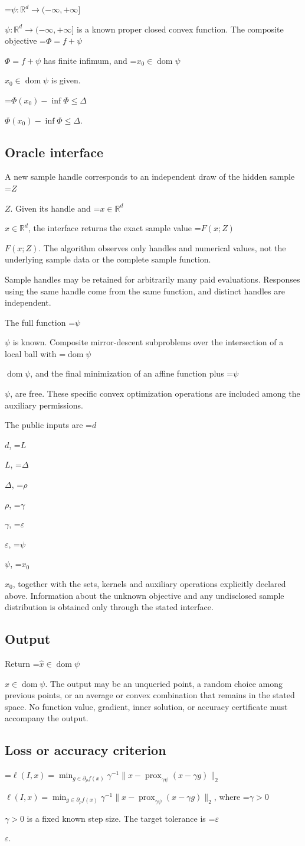 \documentclass[10pt,a4paper]{article}
\newcommand{\AtlasMath}[1]{\par\begingroup\centering\setbox0=\hbox{$\displaystyle #1$}\ifdim\wd0>1.4\linewidth\typeout{ATLAS WIDE FORMULA: \the\wd0}\fi\ifdim\wd0>\linewidth\resizebox{\linewidth}{!}{\box0}\else\box0\fi\par\endgroup}
\newcommand{\AtlasInlineMath}[1]{\begingroup\setbox0=\hbox{$#1$}\ifdim\wd0>.4\linewidth\endgroup\AtlasMath{#1}\else\endgroup$#1$\fi}
\begin{document}
\AtlasInlineMath{\psi:\mathbb{R}^d\to(-\infty,+\infty]} is a known proper closed convex function. The composite objective \AtlasInlineMath{\Phi=f+\psi} has finite infimum, and \AtlasInlineMath{x_0\in\operatorname{dom}\psi} is given.

\AtlasInlineMath{\Phi(x_0)-\inf\Phi\le\Delta}.

\subsection{Oracle interface}
A new sample handle corresponds to an independent draw of the hidden sample \AtlasInlineMath{Z}. Given its handle and \AtlasInlineMath{x\in \mathbb{R}^d}, the interface returns the exact sample value \AtlasInlineMath{F(x;Z)}. The algorithm observes only handles and numerical values, not the underlying sample data or the complete sample function.

Sample handles may be retained for arbitrarily many paid evaluations. Responses using the same handle come from the same function, and distinct handles are independent.

The full function \AtlasInlineMath{\psi} is known. Composite mirror-descent subproblems over the intersection of a local ball with \AtlasInlineMath{\operatorname{dom}\psi}, and the final minimization of an affine function plus \AtlasInlineMath{\psi}, are free. These specific convex optimization operations are included among the auxiliary permissions.

The public inputs are \AtlasInlineMath{d}, \AtlasInlineMath{L}, \AtlasInlineMath{\Delta}, \AtlasInlineMath{\rho}, \AtlasInlineMath{\gamma}, \AtlasInlineMath{\varepsilon}, \AtlasInlineMath{\psi}, \AtlasInlineMath{x_0}, together with the sets, kernels and auxiliary operations explicitly declared above. Information about the unknown objective and any undisclosed sample distribution is obtained only through the stated interface.

\subsection{Output}
Return \AtlasInlineMath{\widehat{x}\in \operatorname{dom}\psi}. The output may be an unqueried point, a random choice among previous points, or an average or convex combination that remains in the stated space. No function value, gradient, inner solution, or accuracy certificate must accompany the output.

\subsection{Loss or accuracy criterion}
\AtlasInlineMath{\ell(I,x)=\min_{g\in\partial_\rho f(x)}\gamma^{-1}\|x-\operatorname{prox}_{\gamma\psi}(x-\gamma g)\|_2}, where \AtlasInlineMath{\gamma>0} is a fixed known step size. The target tolerance is \AtlasInlineMath{\varepsilon}.
\end{document}
